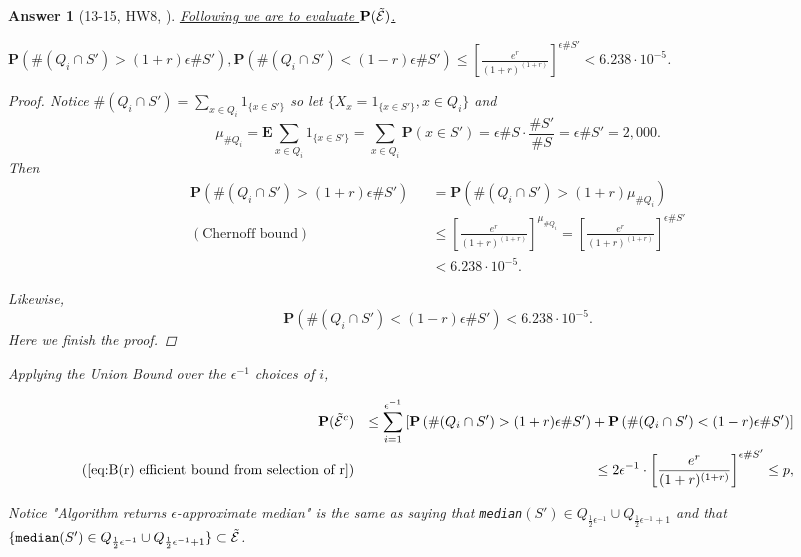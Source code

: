 \documentclass[11pt]{article}
\theoremstyle{numberplain}
\theoremstyle{nonumberplain}
\newtheorem{proof}{Proof}
\newtheorem{ans}{Answer}
\newcommand{\0}{{\mathbf{0}}}
\newcommand{\E}{{\mathbf{E}}}
\renewcommand{\P}{{\mathbf{P}}}
\begin{document}
\begin{ans}[13-15, HW8, \cite{solcornell}]
\underline{Following we are to evaluate $\P(\ev)$.}

\begin{claim}
$\P\left( \#(Q_i\cap S')> (1+r)\epsilon\#S' \right), \P\left( \#(Q_i\cap S')<  (1-r)\epsilon\#S' \right)\leq \left[ \frac{e^{r}}{(1+r)^{(1+r)}} \right]^{\epsilon \# S'} 
 < 6.238\cdot 10^{-5}$.
\end{claim}
\begin{proof}
Notice $\#(Q_i\cap S')=\sum_{x\in Q_i}1_{\{x\in S'\}}$ so let $\{X_{x}=1_{\{x\in S'\}},x\in Q_i\}
$
and 
$$\mu_{\# Q_i}=\E \sum_{x\in Q_i}1_{\{x\in S'\}}=\sum_{x\in Q_i}\P(x\in S')=\epsilon \# S\cdot \frac{\# S'}{\# S}=\epsilon \# S'=2,000.$$
Then 
\begin{eqnarray*}
\P\left( \#(Q_i\cap S')> (1+r)\epsilon\#S' \right)&& =\P\left( \#(Q_i\cap S')> (1+r)\mu_{\# Q_i} \right)\\
(\text{Chernoff bound}) && \leq \left[ \frac{e^{r}}{(1+r)^{(1+r)}} \right]^{\mu_{\# Q_i}} = \left[ \frac{e^{r}}{(1+r)^{(1+r)}} \right]^{\epsilon \# S'} \\
&& < 6.238\cdot 10^{-5}.
\end{eqnarray*}



Likewise, 
$$\P\left( \#(Q_i\cap S')<(1-r)\epsilon\#S' \right) < 6.238\cdot 10^{-5}.$$
Here we finish the proof.
\end{proof}	

Applying the Union Bound over the $\epsilon^{-1}$ choices of $i$,

\begin{eqnarray*}
\P(\ev^c)&&\leq \sum_{i=1}^{\epsilon^{-1}}\left[\P\left( \#(Q_i\cap S')> (1+r)\epsilon\#S' \right)+ \P\left( \#(Q_i\cap S')<  (1-r)\epsilon\#S' \right)\right]\\
\text{(\ref{eq:B(r) efficient bound from selection of r})} && \leq 2\epsilon^{-1} \cdot  \left[ \frac{e^{r}}{(1+r)^{(1+r)}}\right]^{\epsilon \# S'}
\leq p,
\end{eqnarray*}

Notice "Algorithm returns $ \epsilon$-approximate median" is the same as saying that {\tt median}$(S')\in Q_{\frac12\epsilon^{-1}} \cup Q_{\frac12 \epsilon^{-1}+1}$ and that
$\{{\tt median}(S')\in Q_{\frac12\epsilon^{-1}} \cup Q_{\frac12 \epsilon^{-1}+1}\} \\ 
 \subset \tilde{{\cal E}}
$.
\end{ans}
\end{document}
